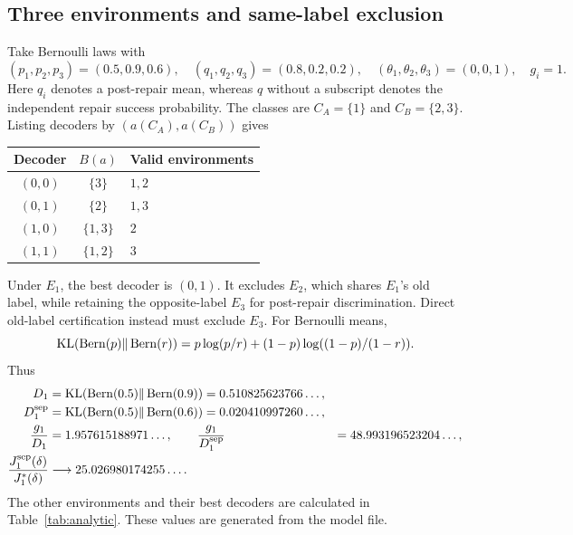 \subsection{Three environments and same-label exclusion}\label{sec:example}
Take Bernoulli laws with
\begin{equation}\label{eq:example}
 (p_1,p_2,p_3)=(0.5,0.9,0.6),\quad
 (q_1,q_2,q_3)=(0.8,0.2,0.2),\quad
 (\theta_1,\theta_2,\theta_3)=(0,0,1),\quad g_i=1.
\end{equation}
Here $q_i$ denotes a post-repair mean, whereas $q$ without a subscript denotes
the independent repair success probability.
The classes are $C_A=\{1\}$ and $C_B=\{2,3\}$.
Listing decoders by $(a(C_A),a(C_B))$ gives
\begin{center}
\begin{tabular}{ccl}
\toprule
Decoder & $B(a)$ & Valid environments\\
\midrule
$(0,0)$ & $\{3\}$ & $1,2$\\
$(0,1)$ & $\{2\}$ & $1,3$\\
$(1,0)$ & $\{1,3\}$ & $2$\\
$(1,1)$ & $\{1,2\}$ & $3$\\
\bottomrule
\end{tabular}
\end{center}
Under $E_1$, the best decoder is $(0,1)$. It excludes $E_2$, which shares
$E_1$'s old label, while retaining the opposite-label $E_3$ for post-repair
discrimination. Direct old-label certification instead must exclude $E_3$.
For Bernoulli means,
\[
 \operatorname{KL}(\operatorname{Bern}(p)\Vert\operatorname{Bern}(r))
 =p\log(p/r)+(1-p)\log((1-p)/(1-r)).
\]
Thus
\begin{align*}
D_1&=\operatorname{KL}(\operatorname{Bern}(0.5)\Vert\operatorname{Bern}(0.9))=0.510825623766\ldots,\\
D_1^{\rm sep}&=\operatorname{KL}(\operatorname{Bern}(0.5)\Vert\operatorname{Bern}(0.6))=0.020410997260\ldots,\\
\frac{g_1}{D_1}&=1.957615188971\ldots,\qquad
\frac{g_1}{D_1^{\rm sep}}&=48.993196523204\ldots,\\
\frac{J_1^{\rm sep}(\delta)}{J_1^*(\delta)}
 &\longrightarrow 25.026980174255\ldots.
\end{align*}
The other environments and their best decoders are calculated in
Table~\ref{tab:analytic}. These values are generated from the model file.

\begin{table}[ht]
\centering\small
\caption{Analytic decoder coefficients for \eqref{eq:example}. Costs have
$g_i=1$. Decoder coordinates follow $(C_A,C_B)$.}\label{tab:analytic}
\end{table}

